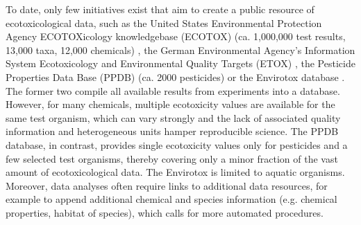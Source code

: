 To date, only few initiatives exist that aim to create a public resource of ecotoxicological data, such as the United States Environmental Protection Agency ECOTOXicology knowledgebase (ECOTOX) (ca. 1,000,000 test results, 13,000 taxa, 12,000 chemicals) \citep{elonen_ecotoxicology_2018}, the German Environmental Agency's Information System Ecotoxicology and Environmental Quality Targets (ETOX) \citep{umweltbundesamt_etox_2019}, the Pesticide Properties Data Base (PPDB) (ca. 2000 pesticides) \citep{lewis_international_2016} or the Envirotox database \citep{healthandenvironmentalsciencesinstitutehesi_envirotox_2019, connors_creation_2019}. The former two compile all available results from experiments into a database. However, for many chemicals, multiple ecotoxicity values are available for the same test organism, which can vary strongly and the lack of associated quality information and heterogeneous units hamper reproducible science. The PPDB database, in contrast, provides single ecotoxicity values only for pesticides and a few selected test organisms, thereby covering only a minor fraction of the vast amount of ecotoxicological data. The Envirotox is limited to aquatic organisms. Moreover, data analyses often require links to additional data resources, for example to append additional chemical and species information (e.g. chemical properties, habitat of species), which calls for more automated procedures. 

